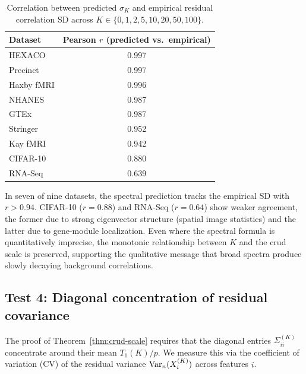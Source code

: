 \begin{table}[h]
\centering
\caption{Correlation between predicted $\sigma_K$ and empirical residual correlation SD
across $K \in \{0,1,2,5,10,20,50,100\}$.}
\label{tab:sigma-pred}
\begin{tabular}{lc}
\toprule
Dataset & Pearson $r$ (predicted vs.\ empirical) \\
\midrule
HEXACO     & 0.997 \\
Precinct   & 0.997 \\
Haxby fMRI & 0.996 \\
NHANES     & 0.987 \\
GTEx       & 0.987 \\
Stringer   & 0.952 \\
Kay fMRI   & 0.942 \\
CIFAR-10   & 0.880 \\
RNA-Seq    & 0.639 \\
\bottomrule
\end{tabular}
\end{table}

In seven of nine datasets, the spectral prediction tracks the empirical SD with
$r > 0.94$. CIFAR-10 ($r = 0.88$) and RNA-Seq ($r = 0.64$) show weaker agreement,
the former due to strong eigenvector structure (spatial image statistics) and the
latter due to gene-module localization.
Even where the spectral formula is quantitatively imprecise, the monotonic relationship
between $K$ and the crud scale is preserved, supporting the qualitative message that
broad spectra produce slowly decaying background correlations.

\subsection{Test 4: Diagonal concentration of residual covariance}

The proof of Theorem~\ref{thm:crud-scale} requires that the diagonal entries
$\Sigma^{(K)}_{ii}$ concentrate around their mean $T_1(K)/p$.
We measure this via the coefficient of variation (CV) of the residual variance
$\operatorname{Var}_n(X_i^{(K)})$ across features $i$.

